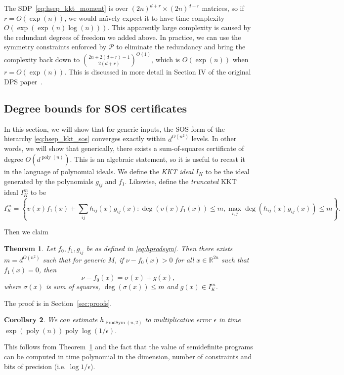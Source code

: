 \documentclass[aps,pra,notitlepage,preprintnumbers,11pt,tightenlines]{revtex4-1}
\newcommand{\eps}{\epsilon}
\renewcommand{\P}{\mathcal{P}}
\DeclareMathOperator{\ProdSym}{ProdSym}
\DeclareMathOperator{\poly}{poly}
\newtheorem{theorem}{Theorem}
\newtheorem{corollary}[theorem]{Corollary}
\newcommand{\thmref}[1]{Theorem~\ref{thm:#1}}
\begin{document}
The SDP~\eqref{eq:hsep_kkt_moment} is over $(2n)^{d+r} \times
(2n)^{d+r}$ matrices, so if $r = O(\exp(n))$, we would na\"{i}vely
expect it to have time complexity $O(\exp(\exp(n) \log(n)))$. This
apparently large complexity is caused by the redundant degrees of
freedom we added above. In practice, we can use the symmetry constraints
enforced by $\P$ to eliminate the redundancy and bring the complexity back down to
$\binom{2n + 2(d+r) - 1}{2(d+r)}^{O(1)}$, which is $O(\exp(n))$ when
$r = O(\exp(n))$. This is discussed in more detail in Section IV of
the original DPS paper~\cite{dps:2003}.

\subsection{Degree bounds for SOS certificates}
In this section, we will show that for generic inputs, the SOS form of
the hierarchy
\eqref{eq:hsep_kkt_sos} converges exactly within $d^{O(n^2)}$
levels. In other words, we will show that generically, there exists a
sum-of-squares certificate of degree $O(d^{\poly(n)})$.  This is an algebraic statement, so it is useful to recast it in the
language of polynomial ideals. We define the \emph{KKT ideal} $I_K$ to
be the ideal generated by the polynomials $g_{ij}$ and $f_1$. Likewise,
define the \emph{truncated} KKT ideal $I_K^m$ to be
\[I_K^m = \left\{ v(x) f_1(x) + \sum_{ij} h_{ij}(x) g_{ij}(x) :
  \deg(v(x) f_1(x)) \leq m, \max_{i, j} \deg(h_{ij}(x) g_{ij}(x)) \leq m \right\}. \]

Then we claim
\begin{theorem}\label{thm:main}
  Let $f_0, f_1, g_{ij}$ be as defined in \eqref{eq:hprodsym}. Then there
  exists $m = d^{O(n^2)}$ such that for generic $M$,
  if $\nu - f_0(x) > 0$ for all $x \in \mathbb{R}^{2n}$ such that
  $f_1(x) = 0$, then 
  \[ \nu - f_0(x) = \sigma(x) + g(x), \]
  where $\sigma(x)$ is sum of squares, $\deg(\sigma(x)) \leq m$ and
  $g(x) \in I_K^m$.
  \label{thm:sos_cert}
\end{theorem}

The proof is in Section~\ref{sec:proofs}.

\begin{corollary}
We can estimate $h_{\ProdSym(n,2)}$ to multiplicative error $\eps$ in time $\exp(\poly(n))\poly\log(1/\eps)$.
\end{corollary}

This follows from \thmref{main} and the fact that the value of semidefinite
programs can be computed in time polynomial in the dimension, number
of constraints and bits of precision (i.e. $\log 1/\eps$).
\end{document}

